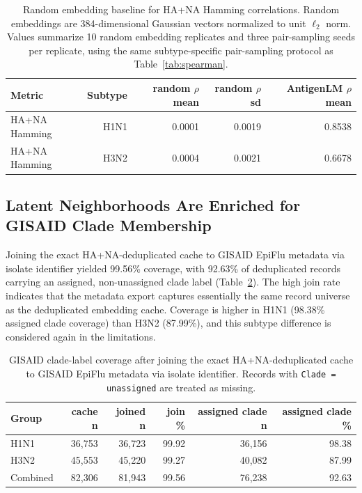 \documentclass[11pt]{article}
\begin{document}
\begin{table}[H]
\centering
\caption{Random embedding baseline for HA+NA Hamming correlations. Random embeddings are 384-dimensional Gaussian vectors normalized to unit $\ell_2$ norm. Values summarize 10 random embedding replicates and three pair-sampling seeds per replicate, using the same subtype-specific pair-sampling protocol as Table~\ref{tab:spearman}.}
\label{tab:random-baseline}
\begin{tabular}{lrrrr}
\toprule
Metric & Subtype & random $\rho$ mean & random $\rho$ sd & AntigenLM $\rho$ mean \\
\midrule
HA+NA Hamming & H1N1 & 0.0001 & 0.0019 & 0.8538 \\
HA+NA Hamming & H3N2 & 0.0004 & 0.0021 & 0.6678 \\
\bottomrule
\end{tabular}
\end{table}

\subsection{Latent Neighborhoods Are Enriched for GISAID Clade Membership}

Joining the exact HA+NA-deduplicated cache to GISAID EpiFlu metadata via isolate identifier yielded 99.56\% coverage, with 92.63\% of deduplicated records carrying an assigned, non-unassigned clade label (Table~\ref{tab:clade-coverage}). The high join rate indicates that the metadata export captures essentially the same record universe as the deduplicated embedding cache. Coverage is higher in H1N1 (98.38\% assigned clade coverage) than H3N2 (87.99\%), and this subtype difference is considered again in the limitations.

\begin{table}[H]
\centering
\caption{GISAID clade-label coverage after joining the exact HA+NA-deduplicated cache to GISAID EpiFlu metadata via isolate identifier. Records with \texttt{Clade = unassigned} are treated as missing.}
\label{tab:clade-coverage}
\begin{tabular}{lrrrrr}
\toprule
Group & cache n & joined n & join \% & assigned clade n & assigned clade \% \\
\midrule
H1N1 & 36,753 & 36,723 & 99.92 & 36,156 & 98.38 \\
H3N2 & 45,553 & 45,220 & 99.27 & 40,082 & 87.99 \\
Combined & 82,306 & 81,943 & 99.56 & 76,238 & 92.63 \\
\bottomrule
\end{tabular}
\end{table}
\end{document}
